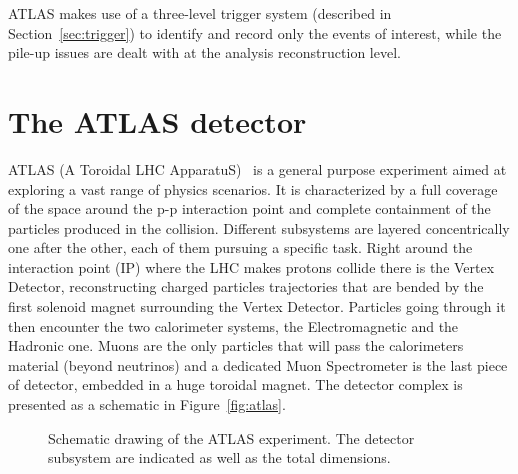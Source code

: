 ATLAS makes use of a three-level trigger system (described in Section~\ref{sec:trigger}) to identify
and record only the events of interest, while the pile-up issues are dealt with at the analysis 
reconstruction level.



\section{The ATLAS detector}\label{sec:atlas}

ATLAS (A Toroidal LHC ApparatuS)~\cite{Aad:2008zzm} is a general purpose experiment
aimed at exploring a vast range of physics scenarios. It is characterized by
a full coverage of the space around the p-p interaction point and complete
containment of the particles produced in the collision. Different subsystems are
layered concentrically one after the other, each of them pursuing a specific task. 
Right around the interaction point
(IP) where the LHC makes protons collide there is the Vertex Detector, reconstructing
charged particles trajectories that are bended by the first solenoid magnet surrounding
the Vertex Detector. Particles going through it then encounter the two calorimeter systems,
the Electromagnetic and the Hadronic one. Muons are the only particles that will pass
the calorimeters material (beyond neutrinos) and a dedicated Muon Spectrometer is the last
piece of detector, embedded in a huge toroidal magnet. The detector complex is presented
as a schematic in Figure~\ref{fig:atlas}. 

\begin{figure}[tb]\begin{center}
	\caption{Schematic drawing of the ATLAS experiment. The detector subsystem are indicated as well as the total dimensions.}
\end{center}\end{figure}

